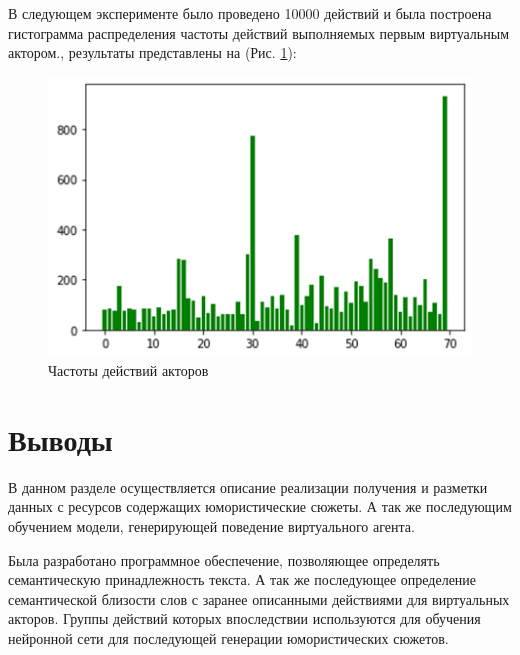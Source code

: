 В следующем эксперименте было проведено 10000 действий и была построена гистограмма распределения 
частоты действий выполняемых первым виртуальным актором., результаты представлены на (Рис. \ref{pic:ris19}):
\begin{figure}[H]
\includegraphics[width=0.75\columnwidth]{./img/ris19.png}
\centering
\caption{Частоты действий акторов}
\label{pic:ris19}
\end{figure}

\section{Выводы}

В данном разделе осуществляется описание реализации получения и разметки данных с ресурсов 
содержащих юмористические сюжеты. А так же последующим обучением модели, генерирующей 
поведение виртуального агента.

Была разработано программное обеспечение, позволяющее определять
семантическую принадлежность текста. А так же последующее определение 
семантической близости слов с заранее описанными действиями для виртуальных акторов. Группы 
действий которых впоследствии используются для обучения нейронной сети для 
последующей генерации юмористических сюжетов.

